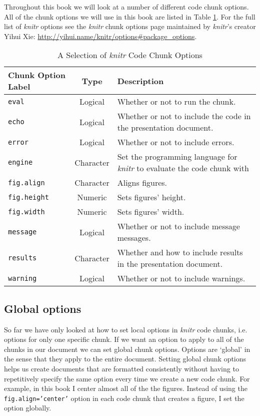 {Throughout this book we will look at a number of different code chunk options. All of the chunk options we will use in this book are listed in Table \ref{ChunkOptionsTable}. For the full list of {\emph{knitr}} options see the {\emph{knitr}} chunk options page maintained by {\emph{knitr}}'s creator Yihui Xie: \url{http://yihui.name/knitr/options#package_options}. 


\begin{table}
  \caption{A Selection of {\emph{knitr}} Code Chunk Options}
  \begin{center}
  \label{ChunkOptionsTable}
  \begin{tabular}{l c p{5cm}}
    \hline  
    Chunk Option Label & Type & Description \\ \hline\hline
    \texttt{eval} & Logical & Whether or not to run the chunk. \\
    \texttt{echo} & Logical & Whether or not to include the code in the presentation document. \\
    \texttt{error} & Logical & Whether or not to include errors. \\
    \texttt{engine} & Character & Set the programming language for {\emph{knitr}} to evaluate the code chunk with \\
    \texttt{fig.align} & Character & Aligns figures. \\
    \texttt{fig.height} & Numeric & Sets figures' height. \\
    \texttt{fig.width} & Numeric & Sets figures' width. \\
    \texttt{message} & Logical & Whether or not to include message messages. \\
    \texttt{results} & Character & Whether and how to include results in the presentation document. \\
    \texttt{warning} & Logical & Whether or not to include warnings. \\
    \hline
  \end{tabular}
  \end{center}
\end{table}

\subsection{Global options}

So far we have only looked at how to set local options in {\emph{knitr}} code chunks, i.e. options for only one specific chunk. If we want an option to apply to all of the chunks in our document we can set global chunk options. Options are `global' in the sense that they apply to the entire document. Setting global chunk options helps us create documents that are formatted consistently without having to repetitively specify the same option every time we create a new code chunk. For example, in this book I center almost all of the the figures. Instead of using the {\tt{fig.align='center'}} option in each code chunk that creates a figure, I set the option globally.

}
